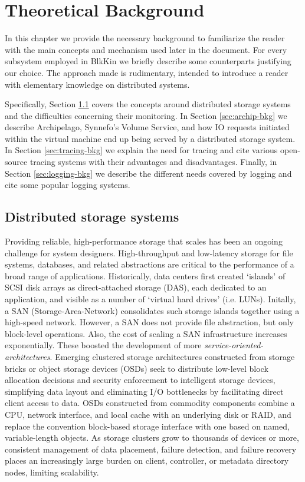 \chapter{Theoretical Background}\label{ch:bkg}

In this chapter we provide the necessary background to familiarize the reader
with the main concepts and mechanism used later in the document. For every
subsystem employed in BlkKin we briefly describe some counterparts justifying
our choice. The approach made is rudimentary, intended to introduce a reader
with elementary knowledge on distributed systems.

Specifically, Section \ref{sec:storage} covers the concepts around distributed
storage systems and the difficulties concerning their monitoring.  In Section
\ref{sec:archip-bkg} we describe Archipelago, Synnefo's Volume Service, and how
IO requests initiated within the virtual machine end up being served by a
distributed storage system. In Section \ref{sec:tracing-bkg} we explain the need
for tracing and cite various open-source tracing systems  with their advantages
and disadvantages. Finally, in Section \ref{sec:logging-bkg} we describe the
different needs covered by logging and cite some popular logging systems.


\section{Distributed storage systems}\label{sec:storage}

Providing reliable, high-performance storage that scales has been an ongoing
challenge for system designers. High-throughput and low-latency storage for file
systems, databases, and related abstractions are critical to the performance of
a broad range of applications. Historically, data centers first created
`islands' of SCSI disk arrays as direct-attached storage (DAS), each dedicated
to an application, and visible as a number of `virtual hard drives' (i.e.
LUNs). Initally, a SAN (Storage-Area-Network) consolidates such storage islands
together using a high-speed network. However, a SAN does not provide file
abstraction, but only block-level operations. Also, the cost of scaling a SAN
infrastructure increases exponentially. These boosted the development of more
\emph{service-oriented-architectures}. Emerging clustered storage architectures
constructed from storage bricks or object storage devices (OSDs) seek to
distribute low-level block allocation decisions and security enforcement to
intelligent storage devices, simplifying data layout and eliminating I/O
bottlenecks by facilitating direct client access to data. OSDs constructed from
commodity components combine a CPU, network interface, and local cache with an
underlying disk or RAID, and replace the convention block-based storage
interface with one based on named, variable-length objects. As storage clusters
grow to thousands of devices or more, consistent management of data placement,
failure detection, and failure recovery places an increasingly large burden on
client, controller, or metadata directory nodes, limiting scalability.

